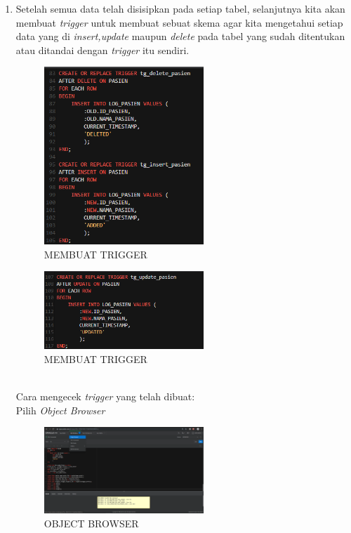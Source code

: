 \documentclass[a4paper, 12pt]{article}
\begin{document}
\begin{enumerate}
\item Setelah semua data telah disisipkan pada setiap tabel, selanjutnya kita akan membuat \textit{trigger} untuk membuat sebuat skema agar kita mengetahui setiap data yang di \textit{insert,update} maupun \textit{delete} pada tabel yang sudah ditentukan atau ditandai dengan \textit{trigger} itu sendiri.
\begin{figure}[h]
\begin{center}
\includegraphics[width=6cm]{figure/TR1.png}
\caption{MEMBUAT TRIGGER}
\end{center}
\end{figure}
\begin{figure}[h]
\begin{center}
\includegraphics[width=6cm]{figure/TR2.png}
\caption{MEMBUAT TRIGGER}
\end{center}
\end{figure} \\

Cara mengecek \textit{trigger} yang telah dibuat: \\
Pilih \textit{Object Browser}
\begin{figure}[h]
\begin{center}
\includegraphics[width=6cm]{figure/OB.png}
\caption{OBJECT BROWSER}
\end{center}
\end{figure} \\


\end{enumerate}
\end{document}
